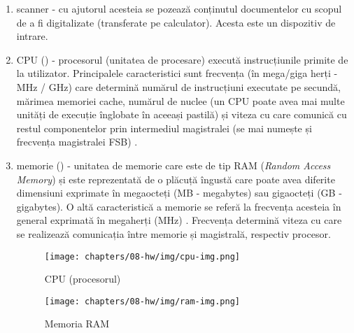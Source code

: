 \begin{enumerate}
	\item scanner - cu ajutorul acesteia se pozează conținutul documentelor
		cu scopul de a fi digitalizate (transferate pe calculator).
		Acesta este un dispozitiv de intrare.
	\item CPU () - procesorul (unitatea de procesare) execută instrucțiunile
		primite de la utilizator. Principalele caracteristici sunt
		frecvența (în mega/giga herți - MHz / GHz) care determină numărul
		de instrucțiuni executate pe secundă, mărimea memoriei cache,
		numărul de nuclee (un CPU poate avea mai multe unități de
		execuție înglobate în aceeași pastilă) și viteza cu care
		comunică cu restul componentelor prin intermediul magistralei
                (se mai numește și frecvența magistralei FSB)
		.

	\item memorie () - unitatea de memorie care este de tip RAM
           (\textit{Random Access Memory}) și
		este reprezentată de o plăcuță îngustă care poate avea diferite
		dimensiuni exprimate în megaocteți (MB  -
		megabytes) sau gigaocteți (GB  -
		gigabytes). O altă caracteristică a memorie se referă la
                frecvența acesteia în general exprimată în megaherți (MHz)
		. Frecvența determină viteza cu care
		se realizează comunicația între memorie și magistrală, respectiv
		procesor.

\begin{figure}[!htbp]
	\centering
	\texttt{[image: chapters/08-hw/img/cpu-img.png]}
	\caption{CPU (procesorul)\protect\footnotemark}
	\label{fig:hw:cpu}
\end{figure}


\begin{figure}[!htbp]
	\centering
	\texttt{[image: chapters/08-hw/img/ram-img.png]}
	\caption{Memoria RAM\protect\footnotemark}
	\label{fig:hw:ram}
\end{figure}



\end{enumerate}
